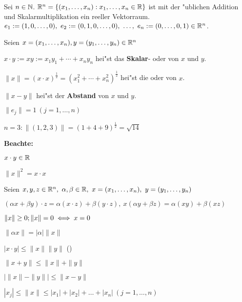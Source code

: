 \documentclass[a4paper,twoside,DIV15,BCOR12mm]{scrbook}
\begin{document}
Sei $n\in\mathbb{N}$. $\mathbb{R}^n=\{(x_1, \ldots, x_n) : x_1,\ldots, x_n \in \mathbb{R}\}$ ist mit der "ublichen Addition und Skalarmultiplikation ein reeller Vektorraum.\\
$e_1:=(1,0,\ldots,0),\ e_2:=(0,1,0,\ldots, 0),\ \ldots,\ e_n:=(0,\ldots,0,1) \in \mathbb{R}^n$.

\begin{definition}
Seien $x=(x_1, \ldots, x_n), y=(y_1, \ldots, y_n) \in \mathbb{R}^n$
\begin{liste}
\item $x\cdot y := xy := x_1y_1+\cdots+x_ny_n$ hei"st das \textbf{Skalar}- oder  von $x$ und $y$.
\item $\|x\|=(x\cdot x)^\frac{1}{2} = (x_1^2 + \cdots + x_n^2)^\frac{1}{2}$ hei"st die  oder  von $x$.
\item {}$\|x-y\|$ hei"st der \textbf{Abstand} von $x$ und $y$.
\end{liste}
\end{definition}

\begin{beispiele}
\item $\|e_j\|=1\ (j=1,\dots,n)$
\item $n=3: \|(1,2,3)\|=(1+4+9)^{\frac{1}{2}}=\sqrt{14}$
\end{beispiele}

\textbf{Beachte: }
\begin{liste}
\item $x \cdot y \in \mathbb{R}$
\item $\|x\|^2=x \cdot x$
\end{liste}

\begin{satz}
Seien $x,y,z \in \mathbb{R}^n,\ \alpha, \beta \in \mathbb{R},\ x=(x_1, \ldots, x_n),\ y=(y_1, \ldots, y_n)$
\begin{liste}
\item $(\alpha x + \beta y)\cdot z=\alpha(x\cdot z)+\beta(y \cdot z),\ x(\alpha y + \beta z)=\alpha(xy)+\beta(xz)$
\item $\|x\|\ge 0; \|x\|=0\iff x=0$
\item $\|\alpha x\|=|\alpha|\|x\|$
\item $|x \cdot y|\le\|x\| \|y\|$  ()
\item $\|x+y\|\le\|x\|+\|y\|$
\item ${\left|\|x\|-\|y\|\right|}\le \|x-y\|$
\item $|x_j|\le\|x\|\le |x_1|+|x_2|+\ldots+|x_n|\ (j=1,\ldots,n)$
\end{liste}
\end{satz}
\end{document}
